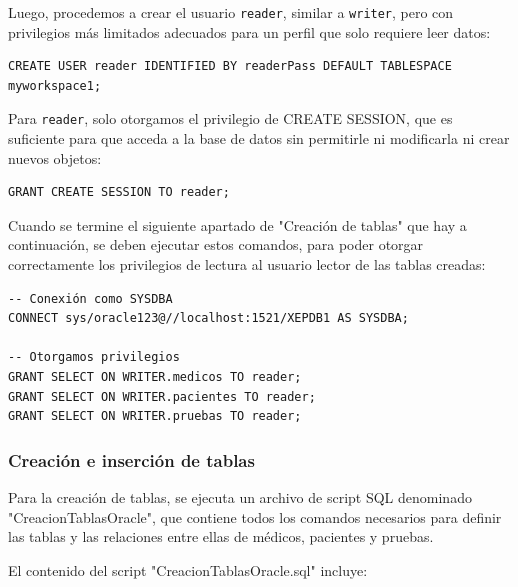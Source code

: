 \documentclass{article}
\begin{document}
Luego, procedemos a crear el usuario \texttt{reader}, similar a \texttt{writer}, pero con privilegios más limitados adecuados para un perfil que solo requiere leer datos:

\begin{lstlisting}[style=bashStyle]
CREATE USER reader IDENTIFIED BY readerPass DEFAULT TABLESPACE myworkspace1;
\end{lstlisting}

Para \texttt{reader}, solo otorgamos el privilegio de CREATE SESSION, que es suficiente para que acceda a la base de datos sin permitirle ni modificarla ni crear nuevos objetos:

\begin{lstlisting}[style=bashStyle]
GRANT CREATE SESSION TO reader;
\end{lstlisting}

Cuando se termine el siguiente apartado de "Creación de tablas" que hay a continuación, se deben ejecutar estos comandos, para poder otorgar correctamente los privilegios de lectura al usuario lector de las tablas creadas:

\begin{lstlisting}[style=bashStyle]
-- Conexión como SYSDBA
CONNECT sys/oracle123@//localhost:1521/XEPDB1 AS SYSDBA;

-- Otorgamos privilegios
GRANT SELECT ON WRITER.medicos TO reader;
GRANT SELECT ON WRITER.pacientes TO reader;
GRANT SELECT ON WRITER.pruebas TO reader;
\end{lstlisting}

\subsubsection{Creación e inserción de tablas}
Para la creación de tablas, se ejecuta un archivo de script SQL denominado "CreacionTablasOracle", que contiene todos los comandos necesarios para definir las tablas y las relaciones entre ellas de médicos, pacientes y pruebas. 

El contenido del script "CreacionTablasOracle.sql" incluye:
\end{document}
